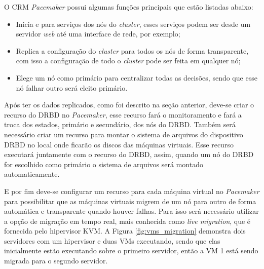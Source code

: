
O \ac{CRM} \textit{Pacemaker} possui algumas funções principais que estão listadas abaixo:
\begin{itemize}
 \item Inicia e para serviços dos nós do \textit{cluster}, esses serviços podem ser desde um servidor \textit{web} até uma interface de rede, 
 por exemplo;
 \item Replica a configuração do \textit{cluster} para todos os nós de forma transparente, com isso a configuração de todo o \textit{cluster} 
 pode ser feita em qualquer nó;
 \item Elege um nó como primário para centralizar todas as decisões, sendo que esse nó falhar outro será eleito primário.
\end{itemize}

Após ter os dados replicados, como foi descrito na seção anterior, deve-se criar o recurso do \ac{DRBD} no \textit{Pacemaker}, esse recurso fará o
monitoramento e fará a troca dos estados, primário e secundário, dos nós do \ac{DRBD}.
Também será necessário criar um recurso para montar o sistema de arquivos do dispositivo \ac{DRBD} no local onde ficarão os discos das máquinas
virtuais. Esse recurso executará juntamente com o recurso do \ac{DRBD}, assim, quando um nó do \ac{DRBD} for escolhido como primário o sistema de
arquivos será montado automaticamente.

E por fim deve-se configurar um recurso para cada máquina virtual no \textit{Pacemaker} para possibilitar que as
máquinas virtuais migrem de um nó para outro de forma automática e transparente quando houver falhas. Para isso será necessário utilizar a 
opção de migração em tempo real, mais conhecida como \textit{live migration}, que é fornecida pelo hipervisor \ac{KVM}.
A Figura \ref{fig:vms_migration} demonstra dois servidores com um hipervisor e duas \ac{VM}s executando, sendo que elas inicialmente estão 
executando sobre o primeiro servidor, então a \ac{VM} 1 está sendo migrada para o segundo servidor.

